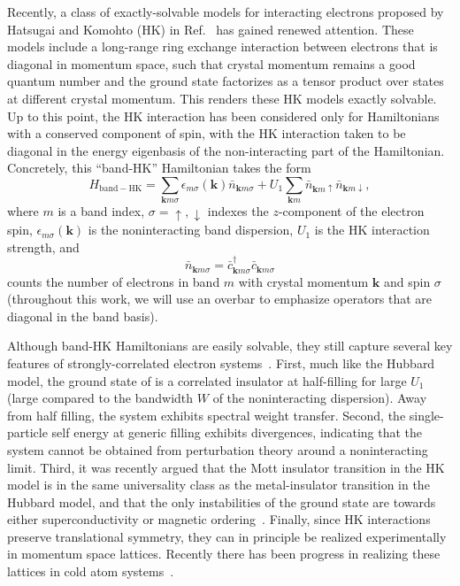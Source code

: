 \documentclass[prb,aps,amssymb,twocolumn,notitlepage]{revtex4-2}
\begin{document}
Recently, a class of exactly-solvable models for interacting electrons proposed by Hatsugai and Komohto (HK) in Ref.~\cite{TheOGHK1992} has gained renewed attention. 
These models include a long-range ring exchange interaction between electrons that is diagonal in momentum space, such that crystal momentum remains a good quantum number and the ground state factorizes as a tensor product over states at different crystal momentum. 
This renders these HK models exactly solvable. 
Up to this point, the HK interaction has been considered only for Hamiltonians with a conserved component of spin, with the HK interaction taken to be diagonal in the energy eigenbasis of the non-interacting part of the Hamiltonian. 
Concretely, this ``band-HK'' Hamiltonian takes the form
\begin{equation}
\label{eq:bandHKmodelintro}
H_{\mathrm{band-HK}} = \sum_{\mathbf{k}m\sigma}\epsilon_{m\sigma}(\mathbf{k})\bar{n}_{\mathbf{k}m\sigma} + U_1\sum_{\mathbf{k}m}\bar{n}_{\mathbf{k}m\uparrow}\bar{n}_{\mathbf{k}m\downarrow},
\end{equation}
where $m$ is a band index, $\sigma=\uparrow,\downarrow$ indexes the $z$-component of the electron spin, $\epsilon_{m\sigma}(\mathbf{k})$ is the noninteracting band dispersion, $U_1$ is the HK interaction strength, and
\begin{equation}
\bar{n}_{\mathbf{k}m\sigma} = \bar{c}^\dag_{\mathbf{k}m\sigma}\bar{c}_{\mathbf{k}m\sigma}\label{eq:bandhk}
\end{equation}
counts the number of electrons in band $m$ with crystal momentum $\mathbf{k}$ and spin $\sigma$ (throughout this work, we will use an overbar to emphasize operators that are diagonal in the band basis). 

Although band-HK Hamiltonians are easily solvable, they still capture several key features of strongly-correlated electron systems~\cite{2022PhilipHKsuperconductor,phillips2020exact,leeb2023quantum}. 
First, much like the Hubbard model, the ground state of  is a correlated insulator at half-filling for large $U_1$ (large compared to the bandwidth $W$ of the noninteracting dispersion). 
Away from half filling, the system exhibits spectral weight transfer. 
Second, the single-particle self energy at generic filling exhibits divergences, indicating that the system cannot be obtained from perturbation theory around a noninteracting limit. 
Third, it was recently argued that the Mott insulator transition in the HK model is in the same universality class as the metal-insulator transition in the Hubbard model, and that the only instabilities of the ground state are towards either superconductivity or magnetic ordering~\cite{2022Philipuniversalityargument,zhao2023proof}.
Finally, since HK interactions preserve translational symmetry, they can in principle be realized experimentally in momentum space lattices. Recently there has been progress in realizing these lattices in cold atom systems~\cite{gadwaymsl21}.
\end{document}
